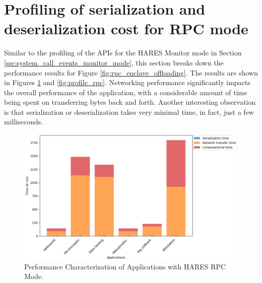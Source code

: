 \documentclass[article, doublespace,nopageskip]{VTthesis} %
\newcommand{\monitor}{HARES }
\begin{document}
    \section{Profiling of serialization and deserialization cost for RPC mode} \label{sse:Profiling of serialization and deserialization cost for RPC mode}
    Similar to the profiling of the APIs for the \monitor Monitor mode in Section \ref{sse:system_call_events_monitor_mode}, this section breaks down the performance results for Figure \ref{fig:rpc_enclave_offloading}. The results are shown in Figures \ref{fig:perf_breakdown_rpc} and \ref{fig:profile_rpc}. Networking performance significantly impacts the overall performance of the application, with a considerable amount of time being spent on transferring bytes back and forth. Another interesting observation is that serialization or deserialization takes very minimal time, in fact, just a few milliseconds.

    \begin{figure}[htb]
        \centering
        \includegraphics[scale=0.6]{figures/perf_breakdown_rpc.png}
        \caption{Performance Characterization of Applications with \monitor RPC Mode.} 
        \label{fig:perf_breakdown_rpc}
    \end{figure}
\end{document}
